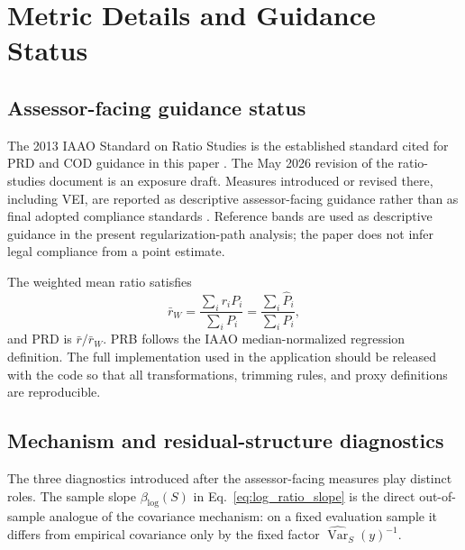 \documentclass[10pt]{article}
\theoremstyle{definition}
\newcommand{\Var}{\operatorname{Var}}
\newcommand{\1}{\mathbf{1}}
\newcommand{\advisorchange}[1]{{\color{blue}#1}}
\newcommand{\oldtext}[1]{\textcolor{blue}{\sout{#1}}}
\newcommand{\newtext}[1]{\textcolor{impGreen}{#1}}
\begin{document}
\appendix

\section{Metric Details and Guidance Status}
\label{app:metrics}

\subsection{Assessor-facing guidance status}

The 2013 IAAO Standard on Ratio Studies is the established standard cited for PRD
and COD guidance in this paper \cite{IAAO2013Ratio}. The May 2026 revision of the
ratio-studies document is an exposure draft. Measures introduced or revised there,
including VEI, are reported as descriptive assessor-facing guidance rather than as
final adopted compliance standards \cite{IAAO2026ExposureRatio}. Reference bands
are used as descriptive guidance in the present
\newtext{regularization-path} analysis; the paper does not
infer legal compliance from a point estimate.

The weighted mean ratio satisfies
\[
\bar r_W
=
\frac{\sum_i r_iP_i}{\sum_iP_i}
=
\frac{\sum_i\widehat P_i}{\sum_iP_i},
\]
and PRD is $\bar r/\bar r_W$. PRB follows the IAAO median-normalized regression
definition. The full implementation \advisorchange{used in the application should
be released} with the code so that all transformations, trimming rules, and proxy
definitions are reproducible.

\subsection{Mechanism and residual-structure diagnostics}

The three diagnostics introduced after the assessor-facing measures play distinct
roles. The sample slope $\beta_{\log}(S)$ in Eq.~\eqref{eq:log_ratio_slope} is the
direct out-of-sample analogue of the covariance mechanism: on a fixed evaluation
sample it differs from empirical covariance only by the fixed factor
$\widehat{\Var}_S(y)^{-1}$.
\end{document}
